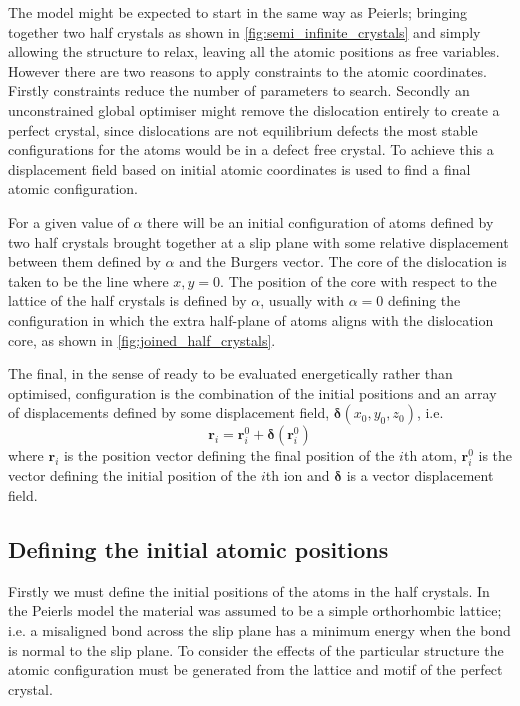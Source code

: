 


The model might be expected to start in the same way as Peierls; bringing together two half crystals as shown in \autoref{fig:semi_infinite_crystals} and simply allowing the structure to relax, leaving all the atomic positions as free variables. However there are two reasons to apply constraints to the atomic coordinates. Firstly constraints reduce the number of parameters to search. Secondly an unconstrained global optimiser might remove the dislocation entirely to create a perfect crystal, since dislocations are not equilibrium defects the most stable configurations for the atoms would be in a defect free crystal. To achieve this a displacement field based on initial atomic coordinates is used to find a final atomic configuration.

For a given value of $\alpha$ there will be an initial configuration of atoms defined by two half crystals brought together at a slip plane with some relative displacement between them defined by $\alpha$ and the Burgers vector. The core of the dislocation is taken to be the line where $x,y = 0$. The position of the core with respect to the lattice of the half crystals is defined by $\alpha$, usually with $\alpha=0$ defining the configuration in which the extra half-plane of atoms aligns with the dislocation core, as shown in \autoref{fig:joined_half_crystals}. 

The final, in the sense of ready to be evaluated energetically rather than optimised, configuration is the combination of  the initial positions and an array of displacements defined by some displacement field, $\bm{\delta}(x_0, y_0, z_0)$, i.e.
\begin{equation}
\mathbf{r}_i = \mathbf{r}_i^0 + \bm{\delta}(\bm{r}_i^0)
\end{equation}
where $\mathbf{r}_i$ is the position vector defining the final position of the $i$th atom, $\mathbf{r}_i^0$ is the vector defining the initial position of the $i$th ion and $\bm{\delta}$ is a vector displacement field.


%
%
\subsection{Defining the initial atomic positions}


Firstly we must define the initial positions of the atoms in the half crystals. In the Peierls model the material was assumed to be a simple orthorhombic lattice; i.e. a misaligned  bond across the slip plane has a minimum energy when the bond is normal to the slip plane. To consider the effects of the particular structure the atomic configuration must be generated from the lattice and motif of the perfect crystal.

